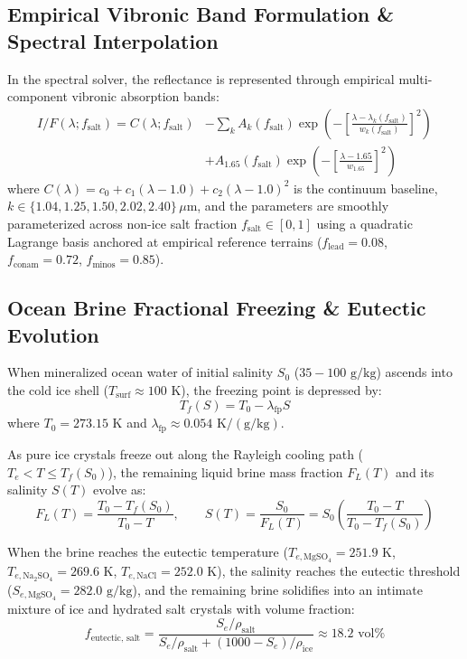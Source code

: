 \documentclass[11pt,a4paper]{article}
\begin{document}
\subsection{Empirical Vibronic Band Formulation \& Spectral Interpolation}
In the spectral solver, the reflectance is represented through empirical multi-component vibronic absorption bands:
\begin{equation}
\begin{aligned}
I/F(\lambda; f_{\text{salt}}) = C(\lambda; f_{\text{salt}}) &- \sum_{k} A_k(f_{\text{salt}}) \exp\left(-\left[\frac{\lambda - \lambda_k(f_{\text{salt}})}{w_k(f_{\text{salt}})}\right]^2\right) \\
&+ A_{1.65}(f_{\text{salt}}) \exp\left(-\left[\frac{\lambda - 1.65}{w_{1.65}}\right]^2\right)
\end{aligned}
\end{equation}
where $C(\lambda) = c_0 + c_1(\lambda - 1.0) + c_2(\lambda - 1.0)^2$ is the continuum baseline, $k \in \{1.04, 1.25, 1.50, 2.02, 2.40\}\,\mu\text{m}$, and the parameters are smoothly parameterized across non-ice salt fraction $f_{\text{salt}} \in [0, 1]$ using a quadratic Lagrange basis anchored at empirical reference terrains ($f_{\text{lead}} = 0.08$, $f_{\text{conam}} = 0.72$, $f_{\text{minos}} = 0.85$).

\subsection{Ocean Brine Fractional Freezing \& Eutectic Evolution}
When mineralized ocean water of initial salinity $S_0$ ($35 - 100\text{ g/kg}$) ascends into the cold ice shell ($T_{\text{surf}} \approx 100\text{ K}$), the freezing point is depressed by:
\begin{equation}
T_f(S) = T_0 - \lambda_{\text{fp}} S
\end{equation}
where $T_0 = 273.15\text{ K}$ and $\lambda_{\text{fp}} \approx 0.054\text{ K}/(\text{g/kg})$.

As pure ice crystals freeze out along the Rayleigh cooling path ($T_e < T \le T_f(S_0)$), the remaining liquid brine mass fraction $F_L(T)$ and its salinity $S(T)$ evolve as:
\begin{equation}
F_L(T) = \frac{T_0 - T_f(S_0)}{T_0 - T}, \qquad S(T) = \frac{S_0}{F_L(T)} = S_0 \left(\frac{T_0 - T}{T_0 - T_f(S_0)}\right)
\end{equation}

When the brine reaches the eutectic temperature ($T_{e,\mathrm{MgSO_4}} = 251.9\text{ K}$, $T_{e,\mathrm{Na_2SO_4}} = 269.6\text{ K}$, $T_{e,\mathrm{NaCl}} = 252.0\text{ K}$), the salinity reaches the eutectic threshold ($S_{e,\mathrm{MgSO_4}} = 282.0\text{ g/kg}$), and the remaining brine solidifies into an intimate mixture of ice and hydrated salt crystals with volume fraction:
\begin{equation}
f_{\text{eutectic, salt}} = \frac{S_e / \rho_{\text{salt}}}{S_e / \rho_{\text{salt}} + (1000 - S_e)/\rho_{\text{ice}}} \approx 18.2\text{ vol}\%
\end{equation}
\end{document}
